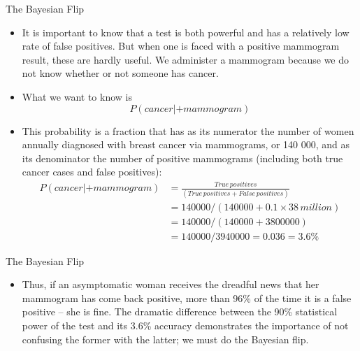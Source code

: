 \documentclass[10pt]{beamer}\usepackage[]{graphicx}\usepackage[]{color}
\begin{document}
\begin{frame}{The Bayesian Flip}
	
	\begin{itemize}
		\item It is important to know that
		a test is both powerful and has a relatively low
		rate of false positives. But when one is faced
		with a positive mammogram result, these are
		hardly useful. We administer a mammogram
		because we do not know whether or not
		someone has cancer.
		\item What we want to know is
$$P(cancer | +mammogram)$$ \pause 
		\item This probability is a fraction
that has as its numerator the number of
		women annually diagnosed with breast
cancer via mammograms, or 140 000, and
as its denominator the number of positive
		mammograms (including both true cancer
cases and false positives):
		\begin{align*}
		P(cancer | +mammogram) &= \frac{True\, positives}{(True\,positives + False\, positives)} \\
		&= 140 000 / (140 000 + 0.1 × 38\,million)
\\
		&= 140 000 / (140 000 + 3 800 000)
\\
		&= 140 000 / 3 940 000 = 0.036 = 3.6\%
		\end{align*}
	\end{itemize}
	
\end{frame}


\begin{frame}{The Bayesian Flip}
\begin{itemize}
	\item Thus, if an asymptomatic woman receives
	the dreadful news that her mammogram
	has come back positive, more than 96\% of
	the time it is a false positive – she is fine.
	The dramatic difference between the 90\%
	statistical power of the test and its 3.6\%
	accuracy demonstrates the importance of not
	confusing the former with the latter; we must
	do the Bayesian flip.
\end{itemize}

\end{frame}
\end{document}
